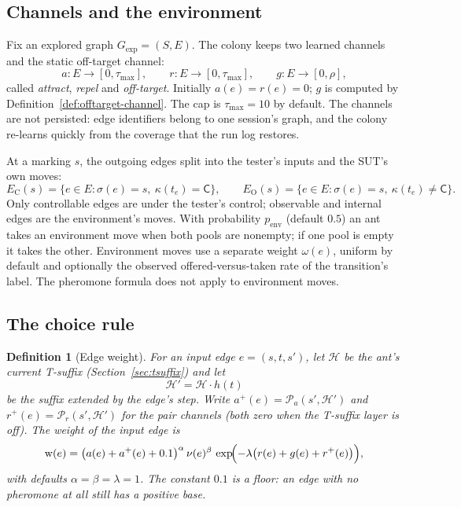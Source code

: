 \documentclass[11pt,a4paper]{article}
\newtheorem{definition}{Definition}[section]
\newcommand{\TS}{\mathcal{H}}
\newcommand{\Pair}{\mathcal{P}}
\newcommand{\Tau}{\tau_{\max}}
\newcommand{\wgt}{\operatorname{w}}
\begin{document}
\subsection{Channels and the environment}

Fix an explored graph $G_{\mathrm{exp}}=(S,E)$.  The colony keeps two learned
channels and the static off-target channel:
\[
  a\colon E\to[0,\Tau],\qquad
  r\colon E\to[0,\Tau],\qquad
  g\colon E\to[0,\rho],
\]
called \emph{attract}, \emph{repel} and \emph{off-target}.  Initially
$a(e)=r(e)=0$; $g$ is computed by Definition~\ref{def:offtarget-channel}.
The cap is $\Tau=10$ by default.  The channels are not persisted: edge
identifiers belong to one session's graph, and the colony re-learns quickly
from the coverage that the run log restores.

At a marking $s$, the outgoing edges split into the tester's inputs and the
SUT's own moves:
\[
  E_{\mathrm{C}}(s)=\{e\in E:\sigma(e)=s,\ \kappa(t_e)=\mathsf{C}\},
  \qquad
  E_{\mathrm{O}}(s)=\{e\in E:\sigma(e)=s,\ \kappa(t_e)\neq\mathsf{C}\}.
\]
Only controllable edges are under the tester's control; observable and
internal edges are the environment's moves.  With probability $p_{\mathrm{env}}$
(default $0.5$) an ant takes an environment move when both pools are nonempty;
if one pool is empty it takes the other.  Environment moves use a separate
weight $\omega(e)$, uniform by default and optionally the observed
offered-versus-taken rate of the transition's label.  The pheromone formula
does not apply to environment moves.

\subsection{The choice rule}\label{sec:choice}

\begin{definition}[Edge weight]\label{def:weight}
For an input edge $e=(s,t,s')$, let $\TS$ be the ant's current T-suffix
(Section~\ref{sec:tsuffix}) and let
\[
  \TS'=\TS\cdot h(t)
\]
be the suffix extended by the edge's step.  Write
$a^{+}(e)=\Pair_a(s',\TS')$ and $r^{+}(e)=\Pair_r(s',\TS')$ for the pair
channels (both zero when the T-suffix layer is off).  The \emph{weight} of the
input edge is
\[
  \wgt(e)=\bigl(a(e)+a^{+}(e)+0.1\bigr)^{\alpha}\,
        \nu(e)^{\beta}\,
        \exp\!\Bigl(-\lambda\bigl(r(e)+g(e)+r^{+}(e)\bigr)\Bigr),
  \label{eq:weight}
\]
with defaults $\alpha=\beta=\lambda=1$.  The constant $0.1$ is a floor: an
edge with no pheromone at all still has a positive base.
\end{definition}
\end{document}
